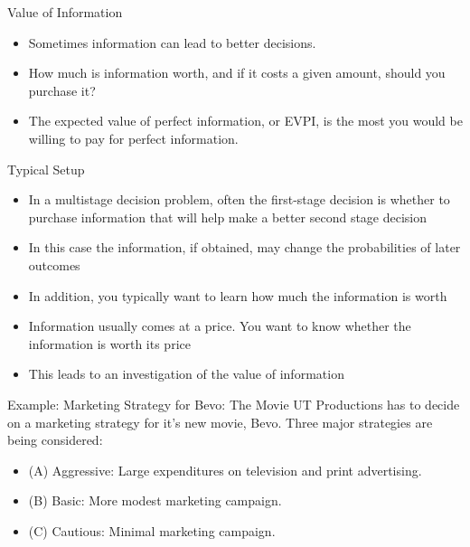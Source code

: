 \documentclass{beamer}\usepackage[]{graphicx}\usepackage[]{color}
\begin{document}
\begin{darkframes}
    \begin{frame}[fragile]{Value of Information}

        \begin{itemize}[<+->]
            \item Sometimes information can lead to better decisions.
            \item How much is information worth, and if it costs a given amount, should you purchase it?
            \item The expected value of perfect information, or EVPI, is the most you would be willing to pay for perfect information.
        \end{itemize}

     \end{frame}


    \begin{frame}[fragile]{Typical Setup}

      \begin{itemize}[<+->]
        \item In a multistage decision problem, often the first-stage decision is whether to purchase information that will help make a better second stage decision
        \item In this case the information, if obtained, may change the probabilities of later outcomes
        \item In addition, you typically want to learn how much the information is worth
        \item Information usually comes at a price.  You want to know whether the information is worth its price
        \item This leads to an investigation of the value of information
        \end{itemize} 

    \end{frame}



    \begin{frame}[fragile]{Example: Marketing Strategy for Bevo: The Movie}
      \fontsize{10}{10}\selectfont
      UT Productions has to decide on a marketing strategy for it's new movie, Bevo.  Three major strategies are being considered:
      \begin{itemize} [<+->]
        \item (A) Aggressive: Large expenditures on television and print advertising.
        \item (B) Basic: More modest marketing campaign.
        \item (C) Cautious: Minimal marketing campaign.
      \end{itemize} 
      

\end{frame}
\end{darkframes}
\end{document}
